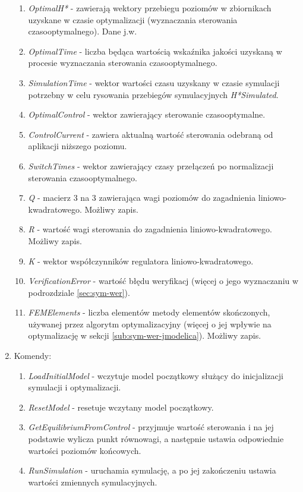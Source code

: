 \begin{enumerate}
\begin{enumerate}
        \item \emph{OptimalH*} - zawierają wektory przebiegu poziomów w zbiornikach uzyskane w czasie optymalizacji (wyznaczania sterowania czasooptymalnego). Dane j.w.
        \item \emph{OptimalTime} - liczba będąca wartością wskaźnika jakości uzyskaną w procesie wyznaczania sterowania czasooptymalnego.
        \item \emph{SimulationTime} - wektor wartości czasu uzyskany w czasie symulacji potrzebny w celu rysowania przebiegów symulacyjnych \emph{H*Simulated}.
        \item \emph{OptimalControl} - wektor zawierający sterowanie czasooptymalne.
        \item \emph{ControlCurrent} - zawiera aktualną wartość sterowania odebraną od aplikacji niższego poziomu.
        \item \emph{SwitchTimes} - wektor zawierający czasy przełączeń po normalizacji sterowania czasooptymalnego.
        \item \emph{Q} - macierz 3 na 3 zawierająca wagi poziomów do zagadnienia liniowo-kwadratowego. Możliwy zapis.
        \item \emph{R} - wartość wagi sterowania do zagadnienia liniowo-kwadratowego. Możliwy zapis.
        \item \emph{K} - wektor współczynników regulatora liniowo-kwadratowego.
        \item \emph{VerificationError} - wartość błędu weryfikacj (więcej o jego wyznaczaniu w podrozdziale \ref{sec:sym-wer}).
        \item \emph{FEMElements} - liczba elementów metody elementów skończonych, używanej przez algorytm optymalizacyjny (więcej o jej wpływie na optymalizację w sekcji \ref{sub:sym-wer-jmodelica}). Możliwy zapis.
    \end{enumerate}
    \item Komendy:
    \begin{enumerate}
        \item \emph{LoadInitialModel} - wczytuje model początkowy służący do inicjalizacji symulacji i optymalizacji.
        \item \emph{ResetModel} - resetuje wczytany model początkowy.
        \item \emph{GetEquilibriumFromControl} - przyjmuje wartość sterowania i na jej podstawie wylicza punkt równowagi, a następnie ustawia odpowiednie wartości poziomów końcowych.
        \item \emph{RunSimulation} - uruchamia symulację, a po jej zakończeniu ustawia wartości zmiennych symulacyjnych.

\end{enumerate}
\end{enumerate}
